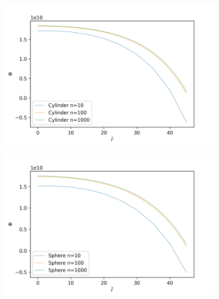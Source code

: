 \documentclass{amsart}
\theoremstyle{definition}
\begin{document}
\begin{figure}[h!]
    \includegraphics[width=.7\linewidth]{cyl}
\end{figure}

\begin{figure}[h!]
    \includegraphics[width=.7\linewidth]{sph}
\end{figure}

 
\bigbreak
\end{document}
